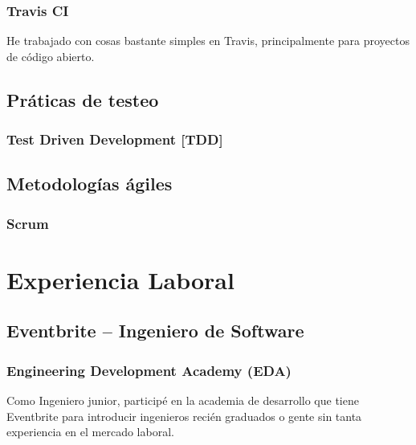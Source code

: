 \documentclass{article}
\begin{document}
\subsubsection{Travis CI}
  \begin{description}
    \item He trabajado con cosas bastante simples en Travis, principalmente para proyectos de código abierto.
  \end{description}
\subsection{Práticas de testeo}
\subsubsection{Test Driven Development [TDD]}
\subsection{Metodologías ágiles}
\subsubsection{Scrum}
\section{Experiencia Laboral}
\subsection{Eventbrite – Ingeniero de Software}
\subsubsection{Engineering Development Academy (EDA)}
  \begin{description}
    \item Como Ingeniero junior, participé en la academia de desarrollo que tiene Eventbrite para introducir ingenieros recién graduados o gente sin tanta experiencia en el mercado laboral.
  \end{description}
\end{document}
